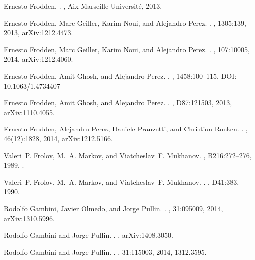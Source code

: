 \documentclass[aps, nofootinbib,superscriptaddress,12pt]{revtex4-2}
\begin{document}
\begin{thebibliography}{100}
Ernesto Frodden.
.
, Aix-Marseille Universit\'e, 2013.

Ernesto Frodden, Marc Geiller, Karim Noui, and Alejandro Perez.
.
, 1305:139, 2013, arXiv:1212.4473.

Ernesto Frodden, Marc Geiller, Karim Noui, and Alejandro Perez.
.
, 107:10005, 2014, arXiv:1212.4060.

Ernesto Frodden, Amit Ghosh, and Alejandro Perez.
.
, 1458:100--115. DOI: 10.1063/1.4734407

Ernesto Frodden, Amit Ghosh, and Alejandro Perez.
.
, D87:121503, 2013, arXiv:1110.4055.

Ernesto Frodden, Alejandro Perez, Daniele Pranzetti, and Christian Roeken.
.
, 46(12):1828, 2014, arXiv:1212.5166.

Valeri~P. Frolov, M.~A. Markov, and Viatcheslav~F. Mukhanov.
, B216:272--276, 1989.
\newblock [,52(1990)].

Valeri~P. Frolov, M.~A. Markov, and Viatcheslav~F. Mukhanov.
.
, D41:383, 1990.

Rodolfo Gambini, Javier Olmedo, and Jorge Pullin.
.
, 31:095009, 2014, arXiv:1310.5996.

Rodolfo Gambini and Jorge Pullin.
.
, arXiv:1408.3050.

Rodolfo Gambini and Jorge Pullin.
.
, 31:115003, 2014, 1312.3595.


\end{thebibliography}
\end{document}

